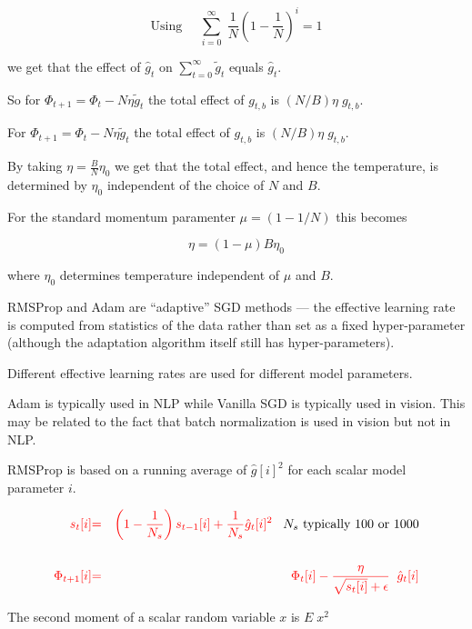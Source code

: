 {\vfill
$$\mathrm{Using}\;\;\;\;\; \sum_{i = 0}^\infty \;\frac{1}{N}\left(1 - \frac{1}{N}\right)^i = 1$$

\vfill
we get that the effect of $\hat{g}_t$ on $\sum_{t=0}^\infty \tilde{g}_t$ equals $\hat{g}_t$.

\vfill
So for $\Phi_{t+1} =  \Phi_t - N\eta\tilde{g}_t$ the total effect of $g_{t,b}$ is $(N/B)\eta\; g_{t,b}$.



For $\Phi_{t+1} =  \Phi_t - N\eta\tilde{g}_t$ the total effect of $g_{t,b}$ is $(N/B)\eta\; g_{t,b}$.

\vfill
By taking $\eta = \frac{B}{N} \eta_0$ we get that the total effect, and hence the temperature, is determined by $\eta_0$ independent of the choice of $N$ and $B$.

\vfill
For the standard momentum paramenter $\mu = (1 - 1/N)$ this becomes

\vfill
{\color{red} $$\eta = (1-\mu)B \eta_0$$}

\vfill
where $\eta_0$ determines temperature independent of $\mu$ and $B$.


RMSProp and Adam are ``adaptive'' SGD methods --- the effective learning rate is computed from statistics of the data rather than set as a fixed hyper-parameter (although
the adaptation algorithm itself still has hyper-parameters).

\vfill
Different effective learning rates are used for different model parameters.

\vfill
Adam is typically used in NLP while Vanilla SGD is typically used in vision.  This may be related to the fact that batch normalization is used in vision but not in NLP.


RMSProp is based on a running average of $\hat{g}[i]^2$ for each scalar model parameter $i$.

\begin{eqnarray*}
{\color{red} s_t[i]} & {\color{red} =} & {\color{red} \left(1-\frac{1}{N_s}\right) s_{t-1}[i] + \frac{1}{N_s} \hat{g}_t[i]^2}\;\;\;\mbox{$N_s$ typically 100 or 1000} \\
\\
{\color{red} \Phi_{t+1}[i]} & {\color{red} =} & {\color{red} \Phi_t[i] - \frac{\eta}{\sqrt{s_t[i]} + \epsilon}\;\; \hat{g}_t[i]}
\end{eqnarray*}

The second moment of a scalar random variable $x$ is $E\;x^2$

}
